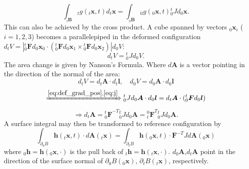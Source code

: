 \documentclass[m,times]{cgMA}
\begin{document}
\begin{equation} \label{eq:volume_integral}
  \int _ { {_t\boldsymbol { B } }}  {_tg} ( {_t\boldsymbol { x }} ,t)  d {_t\boldsymbol { x }} = \int _ { { _0\boldsymbol { B }}} {_0 g } ( {_0\boldsymbol{x}},t) {^t_0 J}d {_0\boldsymbol{x}}.
\end{equation}
This can also be achieved by the cross product. A cube spanned by vectors $_0\boldsymbol{x}_i$ ($i=1,2,3$) becomes a parallelepiped in the deformed configuration $d_tV =|{^t_0\boldsymbol{F}}d_0\boldsymbol{x}_0 \cdot({^t_0\boldsymbol{F}}d_0\boldsymbol{x}_1 \times {^t_0\boldsymbol{F}}d_0\boldsymbol{x}_2)| {d_0V}$:
\begin{equation}\label{eq:j}
  d_tV = {^t_0J} d_0V.
\end{equation}
The area change is given by Nanson's Formula. Where $d\boldsymbol{A}$ is a vector pointing in the direction of the normal of the area:
$$ d{_tV} = d{_t\boldsymbol{A}} \cdot d{_t\boldsymbol{l}}, \quad d{_0V} = d{_0\boldsymbol{A}}\cdot d{_0\boldsymbol{l}} $$
$$ \xRightarrow{\ref{eq:def_grad_pos},\ref{eq:j}} {^t_0J} d_0\boldsymbol{A} \cdot d_0\boldsymbol{l} = d{_t\boldsymbol{A}} \cdot ({^t_0\boldsymbol{F}}d{_0\boldsymbol{l}})$$
\begin{equation}
  \Rightarrow d_t\boldsymbol{A} = {^t_0\boldsymbol{F}}^{-T} {^t_0}J d_0\boldsymbol{A} = {^0_t\boldsymbol{F}}^{T} {^t_0}J d_0\boldsymbol{A}.
\end{equation}
A surface integral may then be transformed to reference configuration by
\begin{equation}\label{eq:surface_integral}
  \int _ { \partial {_0B}  } \boldsymbol{h} ( {_t\boldsymbol{x}} , t ) \cdot d \boldsymbol{A} ( {_t\boldsymbol{x}} ) =  \int _ { \partial {_tB} } \boldsymbol{h} ( {_0\boldsymbol{x}} , t ) \cdot \boldsymbol{F}^{-T}J d \boldsymbol{A} ( {_0\boldsymbol{x}} )
\end{equation}
where $_0\boldsymbol{h} = \boldsymbol{h}(_0\boldsymbol{x},\cdot)$ is the pull back of $_t\boldsymbol{h} = \boldsymbol{h}(_t\boldsymbol{x},\cdot)$. $d_0\boldsymbol{A}$,$d_t\boldsymbol{A}$ point in the direction of the surface normal of $\partial {_0B}(_0\boldsymbol{x})$, $\partial {_tB}(_t\boldsymbol{x})$, respectively.
\cite{MIT:CONTINUUM_MECHANICS}
\cite{MPM:COURSE}
\end{document}
